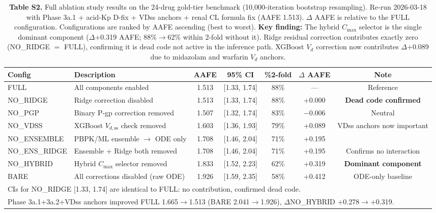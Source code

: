 \documentclass[12pt,a4paper]{article}
\begin{document}
\begin{table}[ht]
\centering
\caption*{\textbf{Table S2.} Full ablation study results on the 24-drug gold-tier benchmark
(10{,}000-iteration bootstrap resampling). Re-run 2026-03-18 with Phase 3a.1 + acid-Kp D-fix + VDss anchors + renal CL formula fix (AAFE 1.513).
$\Delta$ AAFE is relative to the FULL configuration.
Configurations are ranked by AAFE ascending (best to worst).
\textbf{Key finding:} The hybrid $C_{\max}$ selector is the single dominant component
($\Delta$+0.319 AAFE; 88\%$\to$62\% within 2-fold without it).
Ridge residual correction contributes exactly zero (NO\_RIDGE $=$ FULL),
confirming it is dead code not active in the inference path.
XGBoost $V_d$ correction now contributes $\Delta$+0.089 due to midazolam and warfarin $V_d$ anchors.}
\label{tab:s2_ablation}
\begin{tabular}{llccccc}
\toprule
Config & Description & AAFE & 95\% CI & \%2-fold & $\Delta$ AAFE & Note \\
\midrule
FULL         & All components enabled          & 1.513 & [1.33, 1.74] & 88\% & --- & Reference \\
NO\_RIDGE    & Ridge correction disabled       & 1.513 & [1.33, 1.74] & 88\% & +0.000 & \textbf{Dead code confirmed} \\
NO\_PGP      & Binary P-gp correction removed  & 1.507 & [1.32, 1.74] & 83\% & $-$0.006 & Neutral \\
NO\_VDSS     & XGBoost $V_{d,\text{ss}}$ check removed & 1.603 & [1.36, 1.93] & 79\% & +0.089 & VDss anchors now important \\
NO\_ENSEMBLE & PBPK/ML ensemble $\to$ ODE only & 1.708 & [1.46, 2.04] & 71\% & +0.195 & \\
NO\_ENS\_RIDGE & Ensemble + Ridge both removed & 1.708 & [1.46, 2.04] & 71\% & +0.195 & Confirms no interaction \\
NO\_HYBRID   & Hybrid $C_{\max}$ selector removed & 1.833 & [1.52, 2.23] & 62\% & +0.319 & \textbf{Dominant component} \\
BARE         & All corrections disabled (raw ODE) & 1.926 & [1.59, 2.35] & 58\% & +0.412 & ODE-only baseline \\
\midrule
\multicolumn{7}{l}{\small CIs for NO\_RIDGE [1.33, 1.74] are identical to FULL: no contribution, confirmed dead code.} \\
\multicolumn{7}{l}{\small Phase 3a.1+3a.2+VDss anchors improved FULL 1.665$\to$1.513 (BARE 2.041$\to$1.926), $\Delta$NO\_HYBRID +0.278$\to$+0.319.} \\
\bottomrule
\end{tabular}
\end{table}
\end{document}
